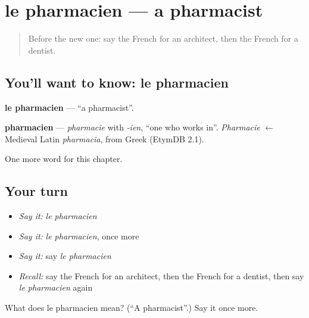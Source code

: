 \section[le pharmacien]{le pharmacien — a pharmacist}

\label{lesson:FR-C166-pharmacien}



\begin{quote}
Before the new one: say the French for an architect, then the French for a dentist.
\end{quote}

\subsection*{You'll want to know: le pharmacien}
\textbf{le pharmacien} — \textquotedblleft{}a pharmacist\textquotedblright{}.

\begin{cousinweb}
\textbf{pharmacien} — \emph{pharmacie} with \emph{-ien}, \textquotedblleft{}one who works in\textquotedblright{}. \emph{Pharmacie} $\leftarrow$ Medieval Latin \emph{pharmacia}, from Greek (EtymDB 2.1).
\end{cousinweb}

\begin{grammarlens}[title={What you've built}]
One more word for this chapter.
\end{grammarlens}

\subsection*{Your turn}
\begin{itemize}
\raggedright
  \item \emph{Say it:} \emph{le pharmacien}
  \item \emph{Say it:} \emph{le pharmacien}, once more
  \item \emph{Say it:} say \emph{le pharmacien}
  \item \emph{Recall:} say the French for an architect, then the French for a dentist, then say \emph{le pharmacien} again
\end{itemize}

\begin{tcolorbox}[breakable,colback=teal!4,colframe=teal!35!black,title={Before you move on}]
What does le pharmacien mean? (\textquotedblleft{}A pharmacist\textquotedblright{}.) Say it once more.
\end{tcolorbox}
